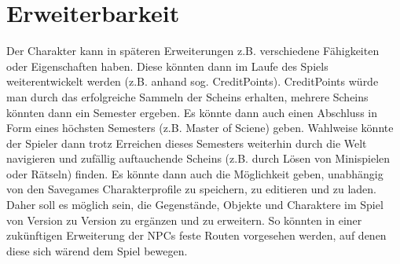 \section{Erweiterbarkeit}
Der \gls{Charakter} kann in späteren Erweiterungen z.B. verschiedene Fähigkeiten oder
Eigenschaften haben. Diese könnten dann im Laufe des Spiels weiterentwickelt werden 
(z.B. anhand sog. CreditPoints). CreditPoints würde man durch das erfolgreiche Sammeln
der \glspl{Schein} erhalten, mehrere \glspl{Schein} könnten dann ein Semester ergeben.
Es könnte dann auch einen Abschluss in Form eines höchsten Semesters (z.B. Master of Sciene) geben.
Wahlweise könnte der \gls{Spieler} dann trotz Erreichen dieses Semesters weiterhin 
durch die \gls{Welt} navigieren und zufällig auftauchende \glspl{Schein} (z.B. durch Lösen von
Minispielen oder Rätseln) finden. Es könnte dann auch die Möglichkeit geben, unabhängig von den 
\glspl{Savegame} Charakterprofile zu speichern, zu editieren und zu laden. Daher soll es möglich sein, 
die Gegenstände, Objekte und Charaktere im Spiel von Version zu Version zu ergänzen und zu erweitern. 
So könnten in einer zukünftigen Erweiterung der NPCs feste Routen vorgesehen werden, auf denen diese sich
wärend dem Spiel bewegen.

